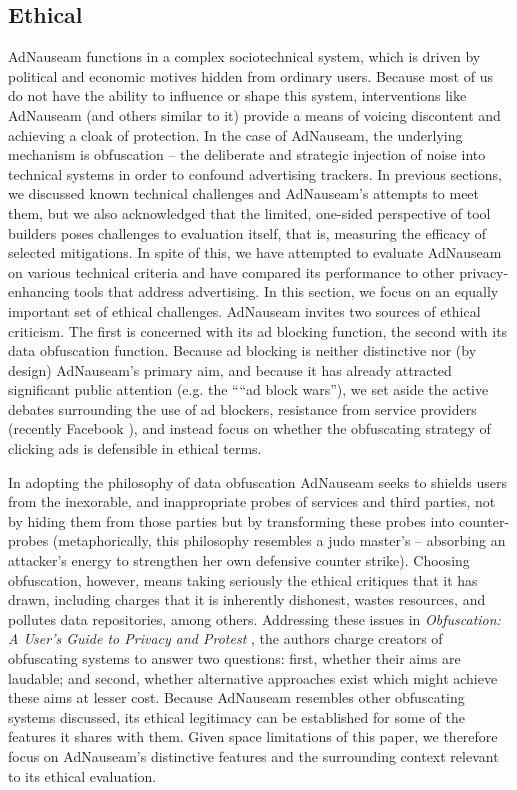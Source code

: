 \documentclass[conference]{IEEEtran}
\begin{document}
\subsection{Ethical}
AdNauseam functions in a complex sociotechnical system, which is driven by political and economic motives hidden from ordinary users. Because most of us do not have the ability to influence or shape this system, interventions like AdNauseam (and others similar to it) provide a means of voicing discontent and achieving a cloak of protection. In the case of AdNauseam, the underlying mechanism is obfuscation -- the deliberate and strategic injection of noise into technical systems in order to confound advertising trackers. In previous sections, we discussed known technical challenges and AdNauseam's attempts to meet them, but we also acknowledged that the limited, one-sided perspective of tool builders poses challenges to evaluation itself, that is, measuring the efficacy of selected mitigations. In spite of this, we have attempted to evaluate AdNauseam on various technical criteria and have compared its performance to other privacy-enhancing tools that address advertising. In this section, we focus on an equally important set of ethical challenges. AdNauseam invites two sources of ethical criticism. The first is concerned with its ad blocking function, the second with its data obfuscation function. Because ad blocking is neither distinctive nor (by design) AdNauseam's primary aim, and because it has already attracted significant public attention (e.g. the ““ad block wars”), we set aside the active debates surrounding the use of ad blockers, resistance from service providers (recently Facebook \cite{Johnston}), and instead focus on whether the obfuscating strategy of clicking ads is defensible in ethical terms.

In adopting the philosophy of data obfuscation AdNauseam seeks to shields users from the inexorable, and inappropriate probes of services and third parties, not by hiding them from those parties but by transforming these probes into counter-probes (metaphorically, this philosophy resembles a judo master's -- absorbing an attacker's energy to strengthen her own defensive counter strike). Choosing obfuscation, however, means taking seriously the ethical critiques that it has drawn, including charges that it is inherently dishonest, wastes resources, and pollutes data repositories, among others. Addressing these issues in \emph{Obfuscation: A User's Guide to Privacy and Protest} \cite{Brunton}, the authors charge creators of obfuscating systems to answer two questions: first, whether their aims are laudable; and second, whether alternative approaches exist which might achieve these aims at lesser cost. Because AdNauseam resembles other obfuscating systems discussed, its ethical legitimacy can be established for some of the features it shares with them. Given space limitations of this paper, we therefore focus on AdNauseam's distinctive features and the surrounding context relevant to its ethical evaluation.
\end{document}
